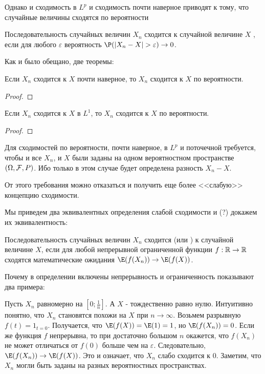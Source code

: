 {Однако и сходимость в $L^{p}$ и сходимость почти наверное приводят к тому, что случайные величины сходятся по вероятности

\begin{mydef} Последовательность случайных величин $X_{n}$ сходится к случайной величине $X$ , если для любого $\varepsilon$ вероятность $\P(|X_{n}-X|>\varepsilon)\to 0$.
\end{mydef}
Как и было обещано, две теоремы:

\begin{myth} Если $X_{n}$ сходится к $X$ почти наверное, то $X_{n}$ сходится к $X$ по вероятности.
\end{myth}
\begin{proof}
\end{proof}
\begin{myth} Если $X_{n}$ сходится к $X$ в $L^{1}$, то $X_{n}$ сходится к $X$ по вероятности.
\end{myth}
\begin{proof}
\end{proof}

Для сходимостей по вероятности, почти наверное, в $L^{p}$ и поточечной требуется, чтобы и все $X_{n}$, и $X$ были заданы на одном вероятностном пространстве $(\Omega,\mathcal{F},P)$. Ибо только в этом случае будет определена разность $X_{n}-X$.

От этого требования можно отказаться и получить еще более <<слабую>> концепцию сходимости.

Мы приведем два эквивалентных определения слабой сходимости и (?) докажем их эквивалентность:

\begin{mydef} Последовательность случайных величин $X_{n}$ сходится  (или ) к случайной величине $X$, если для любой непрерывной ограниченной функции $f:\mathbb{R}\to\mathbb{R}$ сходятся математические ожидания $\E(f(X_{n}))\to \E(f(X))$.
\end{mydef}
\begin{myex}
\end{myex}

Почему в определении включены непрерывность и ограниченность показывают два примера:

\begin{myex}
\label{conv_unif_to_zero}
Пусть $X_{n}$ равномерно на $[0;\frac{1}{n}]$. А $X$ - тождественно равно нулю. Интуитивно понятно, что $X_{n}$ становятся похожи на $X$ при $n\to\infty$. Возьмем разрывную $f(t)=1_{t=0}$. Получается, что $\E(f(X))=\E(1)=1$, но $\E(f(X_{n}))=0$. Если же функция $f$ непрерывна, то при достаточно большом $n$ окажется, что $f(X_{n})$ не может отличаться от $f(0)$ больше чем на $\varepsilon$. Следовательно, $\E(f(X_{n}))\to \E(f(X))$. Это и означает, что $X_{n}$ слабо сходится к $0$. Заметим, что $X_{n}$ могли быть заданы на разных вероятностных пространствах.
\end{myex}

}
